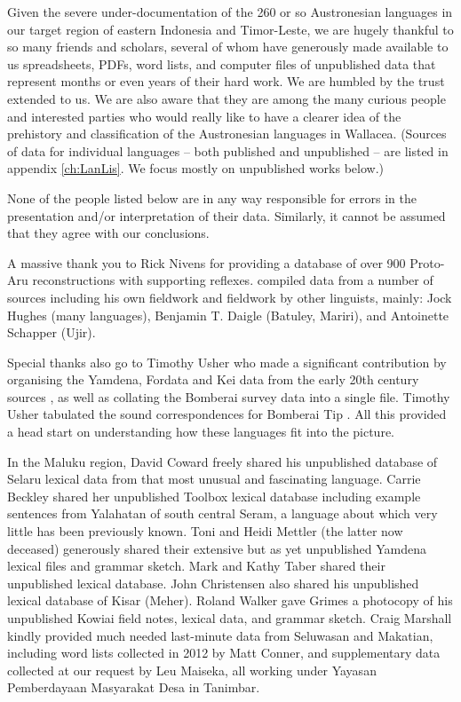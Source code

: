 Given the severe under-documentation of the 260 or so Austronesian languages
in our target region of eastern Indonesia and Timor-Leste,
we are hugely thankful to so many friends and scholars,
several of whom have generously made available to us spreadsheets,
PDFs, word lists, and computer files of unpublished data that represent months or even years of their hard work.
We are humbled by the trust extended to us.
We are also aware that they are among the many curious people and interested parties
who would really like to have a clearer idea of the prehistory and classification of the Austronesian languages in Wallacea.
(Sources of data for individual languages -- both published and unpublished -- are listed in appendix \ref{ch:LanLis}.
We focus mostly on unpublished works below.)

None of the people listed below are in any way responsible
for errors in the presentation and/or interpretation of their data.
Similarly, it cannot be assumed that they agree with our conclusions.

A massive thank you to Rick Nivens for providing a database of
over 900 Proto-Aru reconstructions with supporting reflexes.
\citet{Nivens2017} compiled data from a number of sources including his
own fieldwork and fieldwork by other linguists, mainly: Jock Hughes (many languages),
Benjamin T. Daigle (Batuley, Mariri), and Antoinette Schapper (Ujir).

Special thanks also go to Timothy Usher who made a significant contribution by organising the Yamdena,
Fordata and Kei data from the early 20th century sources \citep{Usher2019},
as well as collating the Bomberai survey data \citep{Donohue2010, Narfafan2011} into a single file.
Timothy Usher tabulated the sound correspondences for Bomberai Tip \citep{Usher2018}.
All this provided a head start on understanding how these languages fit into the picture.

In the Maluku region,
David Coward freely shared his unpublished database of Selaru lexical data
from that most unusual and fascinating language.
Carrie Beckley shared her unpublished Toolbox lexical database
including example sentences from Yalahatan of south central Seram,
a language about which very little has been previously known.
Toni and Heidi Mettler (the latter now deceased) generously
shared their extensive but as yet unpublished Yamdena lexical files and grammar sketch.
Mark and Kathy Taber shared their unpublished lexical database.
John Christensen also shared his unpublished lexical database of Kisar (Meher).
Roland Walker gave Grimes a photocopy of his unpublished Kowiai field notes,
lexical data, and grammar sketch. Craig Marshall kindly
provided much needed last-minute data from Seluwasan and Makatian,
including word lists collected in 2012 by Matt Conner,
and supplementary data collected at our request by Leu Maiseka,
all working under Yayasan Pemberdayaan Masyarakat Desa in Tanimbar.

